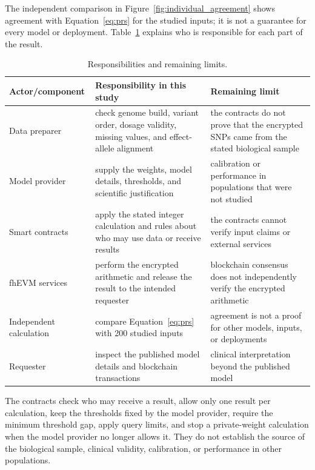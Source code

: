 \documentclass[10pt]{article}
\begin{document}
The independent comparison in Figure~\ref{fig:individual_agreement} shows agreement
with Equation~\ref{eq:prs} for the studied inputs; it is not a guarantee for every
model or deployment.  Table~\ref{tab:correctness_boundary} explains who is responsible
for each part of the result.

\begin{table}[t]
\centering
\caption{Responsibilities and remaining limits.}
\label{tab:correctness_boundary}
\small
\begin{tabularx}{\textwidth}{@{}p{3.2cm}XX@{}}
\toprule
\textbf{Actor/component} & \textbf{Responsibility in this study} & \textbf{Remaining limit} \\
\midrule
Data preparer & check genome build, variant order, dosage validity, missing values, and effect-allele alignment & the contracts do not prove that the encrypted SNPs came from the stated biological sample \\
Model provider & supply the weights, model details, thresholds, and scientific justification & calibration or performance in populations that were not studied \\
Smart contracts & apply the stated integer calculation and rules about who may use data or receive results & the contracts cannot verify input claims or external services \\
fhEVM services & perform the encrypted arithmetic and release the result to the intended requester & blockchain consensus does not independently verify the encrypted arithmetic \\
Independent calculation & compare Equation~\ref{eq:prs} with 200 studied inputs & agreement is not a proof for other models, inputs, or deployments \\
Requester & inspect the published model details and blockchain transactions & clinical interpretation beyond the published model \\
\bottomrule
\end{tabularx}
\end{table}

The contracts check who may receive a result, allow only one result per calculation,
keep the thresholds fixed by the model provider, require the minimum threshold gap,
apply query limits, and stop a private-weight calculation when the model provider no
longer allows it.  They do not establish the
source of the biological sample, clinical validity, calibration, or performance in
other populations.

\end{document}
